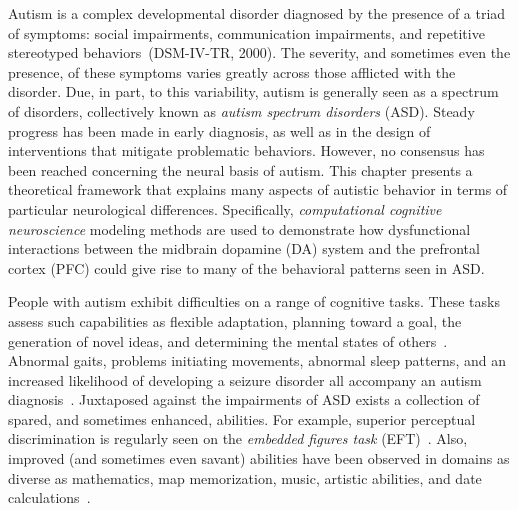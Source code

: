 % 
%
%

Autism is a complex developmental disorder diagnosed by the presence of a triad of symptoms: social impairments, communication impairments, and repetitive stereotyped behaviors~\nocite{RefWorks:98}(DSM-IV-TR, 2000). The severity, and sometimes even the presence, of these symptoms varies greatly across those afflicted with the disorder. Due, in part, to this variability, autism is generally seen as a spectrum of disorders, collectively known as \emph{autism spectrum disorders} (ASD). Steady progress has been made in early diagnosis, as well as in the design of interventions that mitigate problematic behaviors. However, no consensus has been reached concerning the neural basis of autism. This chapter presents a theoretical framework that explains many aspects of autistic behavior in terms of particular neurological differences.  Specifically, \emph{computational cognitive neuroscience} modeling methods are used to demonstrate how dysfunctional interactions between the midbrain dopamine (DA) system and the prefrontal cortex (PFC) could give rise to many of the behavioral patterns seen in ASD.

People with autism exhibit difficulties on a range of cognitive tasks. These tasks assess such capabilities as flexible adaptation, planning toward a goal, the generation of novel ideas, and determining the mental states of others~\cite{BennettoL:1996:AutismPlanningWCST,Ozonoff:1999:AutismStroopWCST,TurnerW:1999:AutismGenerativity,Baron-Cohen:1985:AutismTOM}. Abnormal gaits, problems initiating movements, abnormal sleep patterns, and an increased likelihood of developing a seizure disorder all accompany an autism diagnosis~\cite{RefWorks:99,RefWorks:100,RefWorks:101,RefWorks:102}. Juxtaposed against the impairments of ASD exists a collection of spared, and sometimes enhanced, abilities. For example, superior perceptual discrimination is regularly seen on the \emph{embedded figures task} (EFT)~\cite{WitkinHA:1971:EFT,RefWorks:103,RefWorks:104}. Also, improved (and sometimes even savant) abilities have been observed in domains as diverse as mathematics, map memorization, music, artistic abilities, and date calculations~\cite{RefWorks:105,RefWorks:106,RefWorks:107,RefWorks:37}.   


